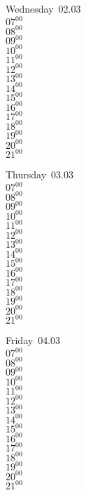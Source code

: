 \documentclass[11pt,a4paper]{book}\usepackage[]{graphicx}\usepackage[]{color}
\begin{document}
\begin{weekdaybox}
  Wednesday~02.03\\
  { 
  \vfill
  $07^{00}$\\
$08^{00}$\\
$09^{00}$\\
$10^{00}$\\
$11^{00}$\\
$12^{00}$\\
$13^{00}$\\
$14^{00}$\\
$15^{00}$\\
$16^{00}$\\
$17^{00}$\\
$18^{00}$\\
$19^{00}$\\
$20^{00}$\\
$21^{00}$\\
  }
\end{weekdaybox}
\clearpage
\begin{headerbox}
\end{headerbox}
\begin{weekdaybox}
  Thursday~03.03\\
  { 
  \vfill
  $07^{00}$\\
$08^{00}$\\
$09^{00}$\\
$10^{00}$\\
$11^{00}$\\
$12^{00}$\\
$13^{00}$\\
$14^{00}$\\
$15^{00}$\\
$16^{00}$\\
$17^{00}$\\
$18^{00}$\\
$19^{00}$\\
$20^{00}$\\
$21^{00}$\\
  }
\end{weekdaybox} 
\begin{weekdaybox}
  Friday~04.03\\
  { 
  \vfill
  $07^{00}$\\
$08^{00}$\\
$09^{00}$\\
$10^{00}$\\
$11^{00}$\\
$12^{00}$\\
$13^{00}$\\
$14^{00}$\\
$15^{00}$\\
$16^{00}$\\
$17^{00}$\\
$18^{00}$\\
$19^{00}$\\
$20^{00}$\\
$21^{00}$\\
  }
\end{weekdaybox}
\end{document}
